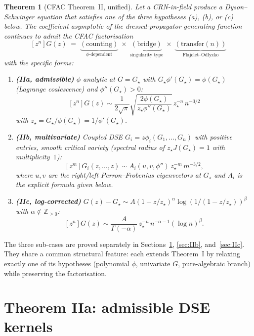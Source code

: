 \documentclass[11pt,a4paper]{article}
\newcommand{\Z}{\mathbb{Z}}
\theoremstyle{plain}
\newtheorem{theorem}{Theorem}
\theoremstyle{definition}
\begin{document}
\begin{thmbox}
\begin{theorem}[CFAC Theorem~II, unified]
\label{thm:II-unified}
Let a CRN-in-field produce a Dyson--Schwinger equation that satisfies
one of the three hypotheses (a), (b), or (c) below.  The coefficient
asymptotic of the dressed-propagator generating function continues to
admit the CFAC factorisation
\[
  [z^n] G(z) \;=\; \underbrace{(\text{counting})}_{\phi\text{-dependent}}
  \;\times\; \underbrace{(\text{bridge})}_{\text{singularity type}}
  \;\times\; \underbrace{(\text{transfer}(n))}_{\text{Flajolet--Odlyzko}}
\]
with the specific forms:
\begin{enumerate}[label=(\roman*), leftmargin=1.8em]
  \item \textbf{(IIa, admissible)} $\phi$ analytic at $G = G_\star$ with
    $G_\star \phi'(G_\star) = \phi(G_\star)$ (Lagrange coalescence) and
    $\phi''(G_\star) > 0$:
    \[
      [z^n] G(z) \sim \frac{1}{2\sqrt{\pi}} \sqrt{\frac{2\phi(G_\star)}{z_\star\phi''(G_\star)}}
      \, z_\star^{-n}\, n^{-3/2}
    \]
    with $z_\star = G_\star/\phi(G_\star) = 1/\phi'(G_\star)$.
  \item \textbf{(IIb, multivariate)} Coupled DSE $G_i = z\phi_i(G_1,\dots,G_n)$
    with positive entries, smooth critical variety (spectral radius of
    $z_\star J(G_\star) = 1$ with multiplicity~$1$):
    \[
      [z^m] G_i(z,\dots,z) \sim A_i(u, v, \phi'') \, z_\star^{-m}\, m^{-3/2},
    \]
    where $u, v$ are the right/left Perron--Frobenius eigenvectors at
    $G_\star$ and $A_i$ is the explicit formula given below.
  \item \textbf{(IIc, log-corrected)} $G(z) - G_\star \sim A (1-z/z_\star)^\alpha
    \log(1/(1-z/z_\star))^\beta$ with $\alpha \notin \Z_{\geq 0}$:
    \[
      [z^n] G(z) \sim \frac{A}{\Gamma(-\alpha)} \, z_\star^{-n}\, n^{-\alpha-1} (\log n)^\beta.
    \]
\end{enumerate}
\end{theorem}
\end{thmbox}

The three sub-cases are proved separately in Sections~\ref{sec:IIa},
\ref{sec:IIb}, and~\ref{sec:IIc}.  They share a common structural
feature: each extends Theorem~I by relaxing exactly one of its
hypotheses (polynomial $\phi$, univariate $G$, pure-algebraic branch)
while preserving the factorisation.

\section{Theorem IIa: admissible DSE kernels}
\label{sec:IIa}
\end{document}
